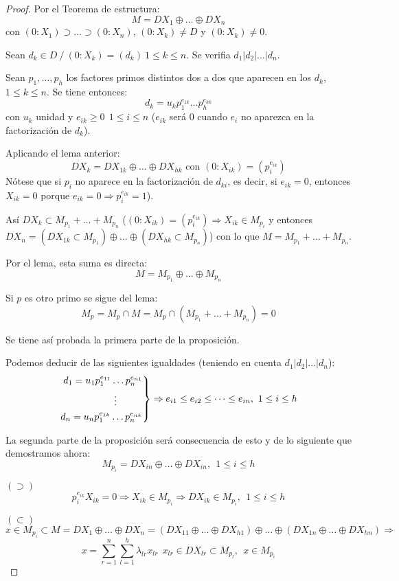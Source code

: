 \documentclass{article}
\newenvironment{rcases}
{\left.\begin{aligned}}
	{\end{aligned}\right\rbrace}
\theoremstyle{theorem-style}  %
\theoremstyle{definition}
\theoremstyle{example-style}
\begin{document}
	\begin{proof}
		Por el Teorema de estructura:
		\[M=DX_1\oplus\dots\oplus DX_n\]
		con $(0:X_1)\supset\dots\supset(0:X_n)$, $(0:X_k)\neq D$ y $(0:X_k)\neq 0$.
		
		Sean $d_k\in D \ / \ (0:X_k)=(d_k) \ 1\leq k\leq n$. Se verifia $d_1|d_2 | \dots | d_n$.
		
		Sean $p_1,\dots,p_h$ los factores primos distintos dos a dos que aparecen en los $d_k$, $1\leq k\leq n$. Se tiene entonces:
		\[d_k=u_kp_1^{e_{1k}}\dots p_h^{e_{hk}}\]
		con $u_k$ unidad y $e_{ik}\geq 0 \ \ 1\leq i\leq n$ ($e_{ik}$ será 0 cuando $e_i$ no aparezca en la factorización de $d_k$).

		Aplicando el lema anterior:
		\[DX_k=DX_{1k}\oplus\dots\oplus DX_{hk} \text{ con } (0:X_{ik})=(p^{e_{ik}}_i)\]
		Nótese que si $p_i$ no aparece en la factorización de $d_{ki}$, es decir, si $e_{ik}=0$, entonces $X_{ik}=0$ porque $e_{ik}=0\Rightarrow p^{e_{ik}}_i=1$).

		Así $DX_k\subset M_{p_1}+\dots+M_{p_n}$ ($(0:X_{ik})=(p^{e_{ik}}_i)\Rightarrow X_{ik}\in M_{p_i}$ y entonces $DX_n=(DX_{1k}\subset M_{p_1})\oplus\dots\oplus (DX_{hk}\subset M_{p_n})$) con lo que $M=M_{p_1}+\dots + M_{p_n}$.

		Por el lema, esta suma es directa:
		\[M=M_{p_1}\oplus\dots\oplus M_{p_n}\]

		Si $p$ es otro primo se sigue del lema:
		\[M_p=M_p\cap M=M_p \cap (M_{p_1}+\dots+M_{p_n})=0\]

		Se tiene así probada la primera parte de la proposición.

		Podemos deducir de las siguientes igualdades (teniendo en cuenta $d_1|d_2|\dots|d_n$):
		\[
		\begin{rcases}
			d_1=u_1p^{e_{11}}_1\dots p^{e_{n1}}_n\\
			\vdots \ \ \ \ \ \ \ \  \\
			d_n=u_np^{e_{1k}}_1\dots p^{e_{nk}}_n\\	
		\end{rcases}
		\Rightarrow e_{i1}\leq e_{i2} \leq\dots\leq e_{in}, \ 1\leq i\leq h
		\]

		La segunda parte de la proposición será consecuencia de esto y de lo siguiente que demostramos ahora:
		\[M_{p_i}=DX_{in}\oplus\dots\oplus DX_{in},\ \ 1\leq i\leq h\]

		$(\supset)$
		\[p^{e_{ik}}_iX_{ik}=0\Rightarrow X_{ik}\in M_{p_i}\Rightarrow DX_{ik} \in M_{p_i},\ \ 1\leq i\leq h\]

		$(\subset)$
		\[x\in M_{p_i} \subset M = DX_1\oplus\dots\oplus DX_n=(DX_{11}\oplus\dots\oplus DX_{h1})\oplus\dots\oplus(DX_{1n}\oplus\dots\oplus DX_{hn}) \Rightarrow\]
		\[x=\sum_{r=1}^n\sum_{l=1}^h \lambda_{lr}x_{lr} \ \ x_{lr}\in DX_{lr}\subset M_{p_l},\ \ x\in M_{p_i}\]


\end{proof}
\end{document}
